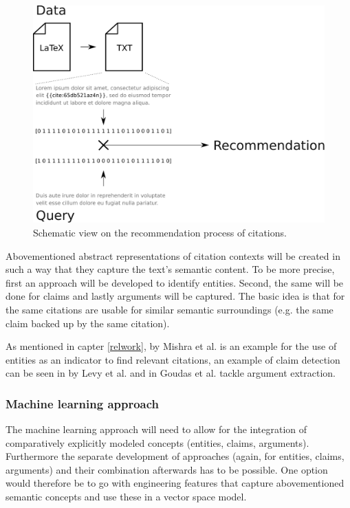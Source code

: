\documentclass{proseminar}
\begin{document}
\begin{figure}[h!]
 \centering
 \includegraphics[scale=0.3]{img/recommendation_process_schema}
 \caption{Schematic view on the recommendation process of citations.}
 \label{fig:schema}
\end{figure}

Abovementioned abstract representations of citation contexts will be created in such a way that they capture the text's semantic content. To be more precise, first an approach will be developed to identify entities. Second, the same will be done for claims and lastly arguments will be captured. The basic idea is that for the same citations are usable for similar semantic surroundings (e.g. the same claim backed up by the same citation).

As mentioned in capter \ref{relwork}, \cite{Mishra2016} by Mishra et al. is an example for the use of entities as an indicator to find relevant citations, an example of claim detection can be seen in \cite{Levy2014} by Levy et al. and in \cite{Goudas2014} Goudas et al. tackle argument extraction.

\subsubsection{Machine learning approach}
The machine learning approach will need to allow for the integration of comparatively explicitly modeled concepts (entities, claims, arguments). Furthermore the separate development of approaches (again, for entities, claims, arguments) and their combination afterwards has to be possible. One option would therefore be to go with engineering features that capture abovementioned semantic concepts and use these in a vector space model.
\end{document}
